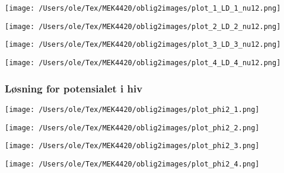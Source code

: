 \documentclass{beamer}
\begin{document}
\begin{frame}
\begin{minipage}[t]{0.45\linewidth}
    \texttt{[image: /Users/ole/Tex/MEK4420/oblig2images/plot\_1\_LD\_1\_nu12.png]}
\end{minipage}
\hspace{0.05\linewidth}
\begin{minipage}[t]{0.45\linewidth}
    \texttt{[image: /Users/ole/Tex/MEK4420/oblig2images/plot\_2\_LD\_2\_nu12.png]}
\end{minipage}
\begin{minipage}[t]{0.45\linewidth}
    \texttt{[image: /Users/ole/Tex/MEK4420/oblig2images/plot\_3\_LD\_3\_nu12.png]}
\end{minipage}
\hspace{0.05\linewidth}
\begin{minipage}[t]{0.45\linewidth}
    \texttt{[image: /Users/ole/Tex/MEK4420/oblig2images/plot\_4\_LD\_4\_nu12.png]}
\end{minipage}
\end{frame}

\begin{frame}
\frametitle{Løsning for potensialet i hiv}
\begin{minipage}[t]{0.45\linewidth}
    \texttt{[image: /Users/ole/Tex/MEK4420/oblig2images/plot\_phi2\_1.png]}
\end{minipage}
\hspace{0.05\linewidth}
\begin{minipage}[t]{0.45\linewidth}
    \texttt{[image: /Users/ole/Tex/MEK4420/oblig2images/plot\_phi2\_2.png]}
\end{minipage}
\begin{minipage}[t]{0.45\linewidth}
    \texttt{[image: /Users/ole/Tex/MEK4420/oblig2images/plot\_phi2\_3.png]}
\end{minipage}
\hspace{0.05\linewidth}
\begin{minipage}[t]{0.45\linewidth}
    \texttt{[image: /Users/ole/Tex/MEK4420/oblig2images/plot\_phi2\_4.png]}
\end{minipage}
\end{frame}
\end{document}
